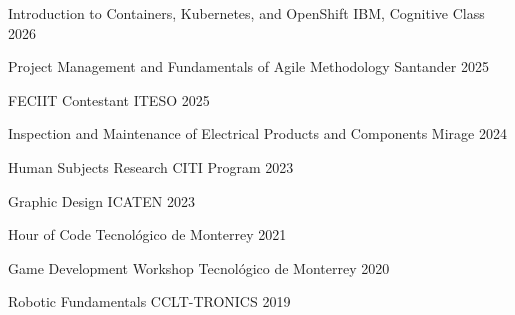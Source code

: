 \begin{cvhonors}
  \cvhonor
  {Introduction to Containers, Kubernetes, and OpenShift}
  {IBM, Cognitive Class}
  {}
  {2026}

  \cvhonor
  {Project Management and Fundamentals of Agile Methodology}
  {Santander}
  {}
  {2025}

  \cvhonor
  {FECIIT Contestant}
  {ITESO}
  {}
  {2025}

  \cvhonor
  {Inspection and Maintenance of Electrical Products and Components}
  {Mirage}
  {}
  {2024}

  \cvhonor
  {Human Subjects Research}
  {CITI Program}
  {}
  {2023}

  \cvhonor
  {Graphic Design}
  {ICATEN}
  {}
  {2023}

  \cvhonor
  {Hour of Code}
  {Tecnológico de Monterrey}
  {}
  {2021}

  \cvhonor
  {Game Development Workshop}
  {Tecnológico de Monterrey}
  {}
  {2020}

  \cvhonor
  {Robotic Fundamentals}
  {CCLT-TRONICS}
  {}
  {2019}
\end{cvhonors}
